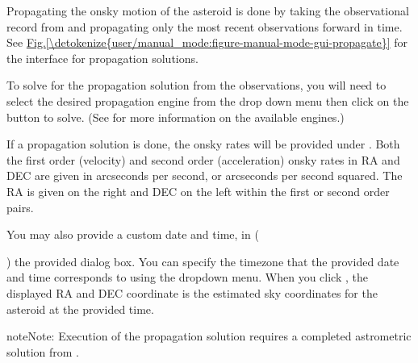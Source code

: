 \documentclass[letterpaper,11pt,english]{sphinxmanual}
\begin{document}
\sphinxAtStartPar
Propagating the on\sphinxhyphen{}sky motion of the asteroid is done by taking the
observational record from
{\hyperref[\detokenize{user/manual_mode:user-manual-mode-procedure-asteroid-observation-record}]{}} and propagating
only the most recent observations forward in time. See
\hyperref[\detokenize{user/manual_mode:figure-manual-mode-gui-propagate}]{Fig.\@ \ref{\detokenize{user/manual_mode:figure-manual-mode-gui-propagate}}} for the interface for propagation solutions.

\sphinxAtStartPar
To solve for the propagation solution from the observations, you will need to
select the desired propagation engine from the drop down menu then click on the
 button to solve.
(See {\hyperref[\detokenize{technical/architecture/services_engines:technical-architecture-services-engines}]{}} for more information on
the available engines.)

\sphinxAtStartPar
If a propagation solution is done, the on\sphinxhyphen{}sky rates will be provided under
. Both the first order (velocity) and
second order (acceleration) on\sphinxhyphen{}sky rates in RA and DEC are given in arcseconds
per second, or arcseconds per second squared. The RA is given on the right and
DEC on the left within the first or second order pairs.

\sphinxAtStartPar
You may also provide a custom date and time, in
(%
\begin{footnote}[7]\sphinxAtStartFootnote
{}
%
\end{footnote}) the
provided dialog box. You can specify the timezone that the provided date and
time corresponds to using the dropdown menu. When you click
, the displayed RA and DEC coordinate is the estimated
sky coordinates for the asteroid at the provided time.

\begin{sphinxadmonition}{note}{Note:}
\sphinxAtStartPar
Execution of the propagation solution requires a completed astrometric
solution from
{\hyperref[\detokenize{user/manual_mode:user-manual-mode-procedure-find-asteroid-location-compute-astrometric-solution}]{}}.
\end{sphinxadmonition}
\end{document}
